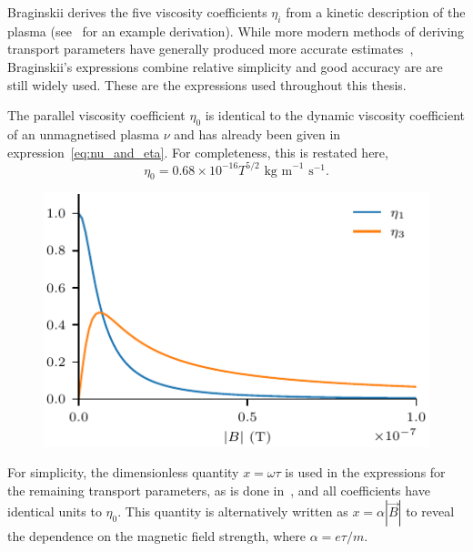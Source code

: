 Braginskii derives the five viscosity coefficients $\eta_i$ from a kinetic description of the plasma (see~\cite{epperleinPlasmaTransportCoefficients1986} for an example derivation). While more modern methods of deriving transport parameters have generally produced more accurate estimates~\cite{epperleinPlasmaTransportCoefficients1986}, Braginskii's expressions combine relative simplicity and good accuracy are are still widely used. These are the expressions used throughout this thesis.

The parallel viscosity coefficient $\eta_0$ is identical to the dynamic viscosity coefficient of an unmagnetised plasma $\nu$ and has already been given in expression~\eqref{eq:nu_and_eta}. For completeness, this is restated here,
\begin{equation}
\label{eq:nu}
\eta_0 = 0.68 \times 10^{-16} T^{5/2} \text{ kg m}^{-1} \text{ s}^{-1}.
\end{equation}

\begin{figure}[t]
  \centering
  \includegraphics[width=0.5\linewidth]{brag_coeffs.pdf}
\label{fig:visc_dep}%
\end{figure}

For simplicity, the dimensionless quantity $x = \omega \tau$ is used in the expressions for the remaining transport parameters, as is done in~\cite{braginskiiTransportProcessesPlasma1965}, and all coefficients have identical units to $\eta_0$. This quantity is alternatively written as $x = \alpha |\vec{B}|$ to reveal the dependence on the magnetic field strength, where $\alpha = e\tau/m$.

